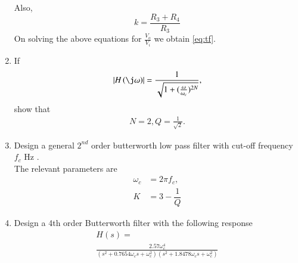 \documentclass[journal,12pt,twocolumn]{IEEEtran}
\renewcommand\thesection{\arabic{section}}
\begin{document}
\begin{enumerate}[label=\thesection.\arabic*,ref=\thesection.\theenumi]
\begin{equation}
\end{equation}
Also,
\begin{equation}
k = \dfrac{R_{3}+R_{4}}{R_{3}}
\end{equation}
On solving the above equations for $\frac{V_o}{V_i}$  we obtain \eqref{eq:tf}. 
\item If 
\begin{equation}
\abs{H\brak{\j\omega}}= \frac{1}{\sqrt{1+{(\frac{\omega}{\omega _c}) ^{2N}}}},
\end{equation}
%
show that
\begin{align}
N = 2, Q = \frac{1}{\sqrt{2}}.
\end{align}

\item Design a general $2^{nd}$ order butterworth low pass filter with cut-off frequency $f_{c}$ Hz  .\\
\solution The relevant parameters are
\begin{align}
\omega_{c} &= 2\pi f_{c},
\\
K &= 3-\dfrac{1}{Q}
\end{align}

\item Design a 4th order Butterworth filter with the following response
\begin{multline}
H(s)  =
\\
 \frac{2.57\omega_{c}^{4}}{(s^{2} + 0.7654\omega_{c}s + \omega_{c}^{2})(s^{2} + 1.8478\omega_{c}s + \omega_{c}^{2})}
\end{multline}

\end{enumerate}
\end{document}
